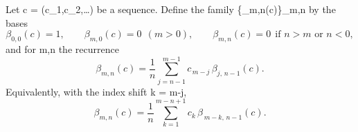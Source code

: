 Let c = (c_1,c_2,\ldots) be a sequence. Define the family \{\beta_{m,n}(c)\}_{m,n } by the bases
\[
\beta_{0,0}(c)=1,\qquad
\beta_{m,0}(c)=0\ \ (m>0),\qquad
\beta_{m,n}(c)=0\ \ \text{if } n>m \text{ or } n<0,
\]
and for m,n  the recurrence
\[
\beta_{m,n}(c)
= \frac{1}{n}\sum_{j=n-1}^{m-1} c_{\,m-j}\, \beta_{j,\,n-1}(c).
\]
Equivalently, with the index shift k = m-j,
\[
\beta_{m,n}(c)
= \frac{1}{n}\sum_{k=1}^{m-n+1} c_k\, \beta_{\,m-k,\,n-1}(c).
\]
